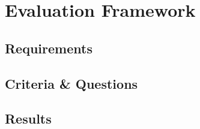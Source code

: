 
\chapter{Evaluation Framework}\label{chapter: framework}

	\section{Requirements}
	
	\section{Criteria \& Questions}
	
	\section{Results}